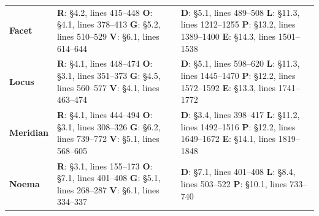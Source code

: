 \begin{longtable}{@{}P{.8in}P{2.45in}P{2.45in}@{}}
\addlinespace[.65em]
\textbf{Facet} & \textbf{R}: \S{}4.2, lines 415--448 \newline
\textbf{O}: \S{}4.1, lines 378--413 \newline
\textbf{G}: \S{}5.2, lines 510--529 \newline
\textbf{V}: \S{}6.1, lines 614--644 &
\textbf{D}: \S{}5.1, lines 489--508 \newline
\textbf{L}: \S{}11.3, lines 1212--1255 \newline
\textbf{P}: \S{}13.2, lines 1389--1400 \newline
\textbf{E}: \S{}14.3, lines 1501--1538\\
\addlinespace[.65em]
\textbf{Locus} & \textbf{R}: \S{}4.1, lines 448--474 \newline
\textbf{O}: \S{}3.1, lines 351--373 \newline
\textbf{G}: \S{}4.5, lines 560--577 \newline
\textbf{V}: \S{}4.1, lines 463--474 &
\textbf{D}: \S{}5.1, lines 598--620 \newline
\textbf{L}: \S{}11.3, lines 1445--1470 \newline
\textbf{P}: \S{}12.2, lines 1572--1592 \newline
\textbf{E}: \S{}13.3, lines 1741--1772\\
\addlinespace[.65em]
\textbf{Meridian} & \textbf{R}: \S{}4.1, lines 444--494 \newline
\textbf{O}: \S{}3.1, lines 308--326 \newline
\textbf{G}: \S{}6.2, lines 739--772 \newline
\textbf{V}: \S{}5.1, lines 568--605 &
\textbf{D}: \S{}3.4, lines 398--417 \newline
\textbf{L}: \S{}11.2, lines 1492--1516 \newline
\textbf{P}: \S{}12.2, lines 1649--1672 \newline
\textbf{E}: \S{}14.1, lines 1819--1848\\
\addlinespace[.65em]
\textbf{Noema} & \textbf{R}: \S{}3.1, lines 155--173 \newline
\textbf{O}: \S{}7.1, lines 401--408 \newline
\textbf{G}: \S{}5.1, lines 268--287 \newline
\textbf{V}: \S{}6.1, lines 334--337 &
\textbf{D}: \S{}7.1, lines 401--408 \newline
\textbf{L}: \S{}8.4, lines 503--522 \newline
\textbf{P}: \S{}10.1, lines 733--740 \newline

\end{longtable}
